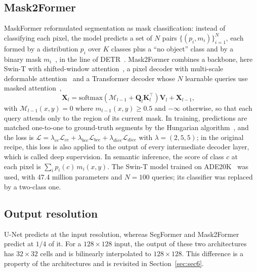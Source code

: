 \documentclass[final,5p,times,twocolumn]{elsarticle}
\begin{document}
\subsection{Mask2Former}\label{subsec:mask2former}

MaskFormer reformulated segmentation as mask classification: instead of classifying each pixel, the model predicts a set of $N$ pairs $\{(p_i,m_i)\}_{i=1}^N$, each formed by a distribution $p_i$ over $K$ classes plus a ``no object'' class and by a binary mask $m_i$~\cite{cheng2021maskformer}, in the line of DETR~\cite{carion2020detr}. Mask2Former combines a backbone, here Swin-T with shifted-window attention~\cite{liu2021swin}, a pixel decoder with multi-scale deformable attention~\cite{zhu2021deformable} and a Transformer decoder whose $N$ learnable queries use masked attention~\cite{cheng2022mask2former},
\begin{equation}\label{eq:maskedattn}
\mathbf{X}_l=\mathrm{softmax}(\mathcal{M}_{l-1}+\mathbf{Q}_l\mathbf{K}_l^\top)\mathbf{V}_l+\mathbf{X}_{l-1},
\end{equation}
with $\mathcal{M}_{l-1}(x,y)=0$ where $m_{l-1}(x,y)\geq 0.5$ and $-\infty$ otherwise, so that each query attends only to the region of its current mask. In training, predictions are matched one-to-one to ground-truth segments by the Hungarian algorithm~\cite{kuhn1955}, and the loss is $\mathcal{L}=\lambda_{ce}\mathcal{L}_{ce}+\lambda_{bce}\mathcal{L}_{bce}+\lambda_{dice}\mathcal{L}_{dice}$ with $\lambda=(2,5,5)$; in the original recipe, this loss is also applied to the output of every intermediate decoder layer, which is called deep supervision. In semantic inference, the score of class $c$ at each pixel is $\sum_i p_i(c)\,m_i(x,y)$. The Swin-T model trained on ADE20K~\cite{zhou2017ade} was used, with 47.4 million parameters and $N=100$ queries; its classifier was replaced by a two-class one.

\subsection{Output resolution}\label{subsec:outres}

U-Net predicts at the input resolution, whereas SegFormer and Mask2Former predict at $1/4$ of it. For a $128\times128$ input, the output of these two architectures has $32\times32$ cells and is bilinearly interpolated to $128\times128$. This difference is a property of the architectures and is revisited in Section~\ref{sec:sec6}.

\end{document}
